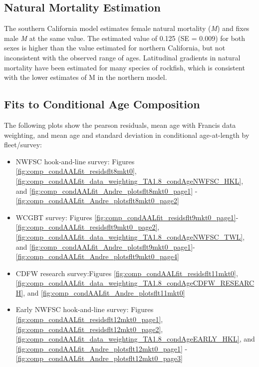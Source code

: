 \documentclass[
  english,
  a4paper,
]{article}
\begin{document}
\vspace{0.5cm}

\hypertarget{natural-mortality-estimation}{%
\subsection{Natural Mortality Estimation}\label{natural-mortality-estimation}}

The southern California model estimates female natural mortality (\emph{M}) and fixes male \emph{M} at the same value. The estimated value of 0.125 (SE = 0.009) for both sexes is higher than the value estimated for northern California, but not inconsistent with the observed range of ages. Latitudinal gradients in natural mortality have been estimated for many species of rockfish, which is consistent with the lower estimates of M in the northern model.

\hypertarget{fits-to-conditional-age-composition}{%
\subsection{Fits to Conditional Age Composition}\label{fits-to-conditional-age-composition}}

The following plots show the pearson residuals, mean age with Francis data weighting, and
mean age and standard deviation in conditional age-at-length by fleet/survey:

\begin{itemize}
\item
  NWFSC hook-and-line survey: Figures \ref{fig:comp_condAALfit_residsflt8mkt0},
  \ref{fig:comp_condAALfit_data_weighting_TA1.8_condAgeNWFSC_HKL}, and \ref{fig:comp_condAALfit_Andre_plotsflt8mkt0_page1} - \ref{fig:comp_condAALfit_Andre_plotsflt8mkt0_page2}
\item
  WCGBT survey: Figures \ref{fig:comp_condAALfit_residsflt9mkt0_page1}- \ref{fig:comp_condAALfit_residsflt9mkt0_page2}, \ref{fig:comp_condAALfit_data_weighting_TA1.8_condAgeNWFSC_TWL}, and \ref{fig:comp_condAALfit_Andre_plotsflt9mkt0_page1}- \ref{fig:comp_condAALfit_Andre_plotsflt9mkt0_page4}
\item
  CDFW research survey:Figures \ref{fig:comp_condAALfit_residsflt11mkt0},
  \ref{fig:comp_condAALfit_data_weighting_TA1.8_condAgeCDFW_RESEARCH}, and \ref{fig:comp_condAALfit_Andre_plotsflt11mkt0}
\item
  Early NWFSC hook-and-line survey: Figures \ref{fig:comp_condAALfit_residsflt12mkt0_page1}, \ref{fig:comp_condAALfit_residsflt12mkt0_page2},
  \ref{fig:comp_condAALfit_data_weighting_TA1.8_condAgeEARLY_HKL}, and \ref{fig:comp_condAALfit_Andre_plotsflt12mkt0_page1} - \ref{fig:comp_condAALfit_Andre_plotsflt12mkt0_page3}
\end{itemize}
\end{document}
